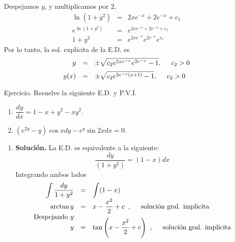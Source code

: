 \documentclass{beamer}
\begin{document}
\begin{frame}[t]
	\begin{exampleblock}{}
		Despejamos \(y\), y multiplicamos por \(2\),
		\[
			\begin{array}{rcl}
				\ln (1+y^2) & = & 2xe^{-x} +2e^{-x} +c_1 \\[2mm]
				e^{\ln (1+y^2)} & = & e^{2xe^{-x} +2e^{-x} +c_1} \\[2mm]
				1+y^2 & = & e^{2xe^{-x}} e^{2e^{-x}} e^{c_1}
			\end{array}
		\]
		Por lo tanto, la sol. explícita de la E.D. es
		\[
			\begin{array}{rcl}
				y & = & \pm \sqrt{c_2e^{2xe^{-x}} e^{2e^{-x}} -1} , \hspace{5mm} c_2 >0\\[2mm]
				y(x) & = & \pm \sqrt{c_2e^{2e^{-x} (x+1)} -1}, \hspace{5mm}c_2 >0
			\end{array}
		\]
	\end{exampleblock}
\end{frame}

\begin{frame}[t]
	\vspace{-3mm}
	\begin{alertblock}{Ejercicio.}
		Resuelve la siguiente E.D. y P.V.I.
		\begin{enumerate}
			\item \(\dfrac{dy}{dx} =1-x+y^2-xy^2\).
			\item \((e^{2y} -y) \cos xdy -e^y \sin 2xdx=0\).
		\end{enumerate}
	\end{alertblock}
	\begin{enumerate}
		\item \textbf{Solución.} La E.D. es equivalente a la siguiente:
			\[
				\dfrac{dy}{(1+y^2)}  =  (1-x) dx
			\]
			Integrando ambos lados
			\[
				\begin{array}{rcl}
					 \displaystyle\int \dfrac{dy}{1+y^2} & = & \displaystyle\int (1-x) \\[2mm]
					 \arctan y & = & x- \dfrac{x^2}{2} +c \;\;, \hspace{5mm} \mbox{solución gral. implícita}\\
					\mbox{Despejando } y&&\\[-2mm]
					y & = & \tan \Bigg(x- \dfrac{x^2}{2} +c\Bigg) \;\;, \hspace{5mm} \mbox{solución gral. implícita}
				\end{array}
			\]
	\end{enumerate}
\end{frame}
\end{document}
